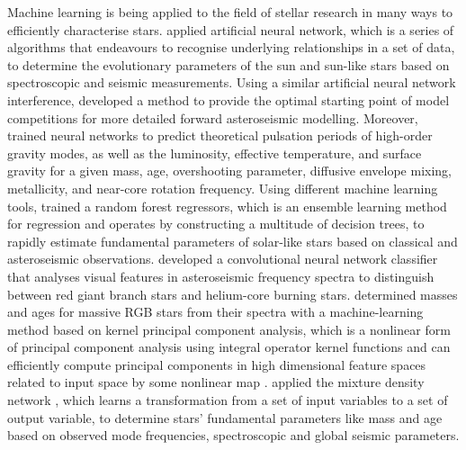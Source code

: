Machine learning is being applied to the field of stellar research in many ways to efficiently characterise stars.
\citet{2016MNRAS.461.4206V} applied artificial neural network, which is a series of algorithms that endeavours to recognise underlying relationships in a set of data, to determine the evolutionary parameters of the sun and sun-like stars based on spectroscopic and seismic measurements. Using a similar artificial neural network interference, \citet{2019PASP..131j8001H} developed a method to provide the optimal starting point of model competitions for more detailed forward asteroseismic modelling. Moreover, \citet{2021arXiv210313394M} trained neural networks to predict theoretical pulsation periods of high-order gravity modes, as well as the luminosity, effective temperature, and surface gravity for a given mass, age, overshooting parameter, diffusive envelope mixing, metallicity, and near-core rotation frequency. 
%
Using different machine learning tools, \citet{2016ApJ...830...31B} trained a random forest regressors\citep{ho1995random}, which is an ensemble learning method for regression and operates by constructing a multitude of decision trees, to rapidly estimate fundamental parameters of solar-like stars based on classical and asteroseismic observations. \citet{2018MNRAS.476.3233H} developed a convolutional neural network classifier that analyses visual features in asteroseismic frequency spectra to distinguish between red giant branch stars and helium-core burning stars. \citet{2019MNRAS.484.5315W} determined masses and ages for massive RGB stars from their spectra with a machine-learning method based on kernel principal component analysis, which is a nonlinear form of principal component analysis using integral operator kernel functions and can efficiently compute principal components in high dimensional feature spaces related to input space by some nonlinear map \citep{scholkopf1997kernel}. \citet{2020MNRAS.499.2445H} applied the mixture density network \citep{bishop1994mixture}, which learns a transformation from a set of input variables to a set of output variable, to determine stars' fundamental parameters like mass and age based on observed mode frequencies, spectroscopic and global seismic parameters.


